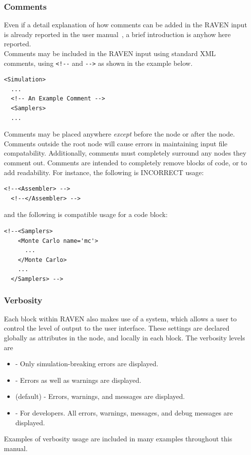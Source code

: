 \subsubsection{Comments}
Even if a detail explanation of how comments can be added in the RAVEN input is already reported in the user manual~\cite{RAVENuserManual}, a brief introduction is anyhow here reported. 
\\Comments may be included in the RAVEN input using standard XML comments,
using \verb|<!--| and \verb|-->| as shown in the example below.
\begin{lstlisting}[style=XML]
<Simulation>
  ...
  <!-- An Example Comment -->
  <Samplers>
  ...
\end{lstlisting}
Comments may be placed anywhere \emph{except} before the 
node or after the  node.
%
Comments outside the root node will cause errors in maintaining input file
compatability.
%
Additionally, comments must completely surround any nodes they comment out.
%
Comments are intended to completely remove blocks of code, or to add readability.
%
For instance, the following is INCORRECT usage:
\begin{lstlisting}[style=XML]
  <!--<Assembler> -->
  <!--</Assembler> -->
\end{lstlisting}
%
and the following is compatible usage for a code block:
%
\begin{lstlisting}[style=XML]
  <!--<Samplers>
    <Monte Carlo name='mc'>
      ...
    </Monte Carlo>
    ...
  </Samplers> -->
\end{lstlisting}


\subsubsection{Verbosity}
\label{subsec:verbosity}
Each block within RAVEN also makes use of a  system,
which allows a user to control the level of output to the user interface.
These settings are declared globally as attributes in the  node,
and locally in each block.  The verbosity levels are
\begin{itemize}
\item {} - Only simulation-breaking errors are displayed.
\item {} - Errors as well as warnings are displayed.
\item {} (default) - Errors, warnings, and messages are displayed.
\item {} - For developers. All errors, warnings, messages, and debug messages are displayed.
\end{itemize}
Examples of verbosity usage are included in many examples throughout this manual.


